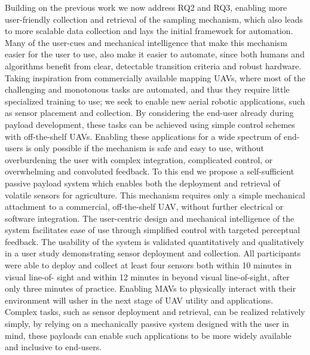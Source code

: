Building on the previous work we now address RQ2 and RQ3, enabling more user-friendly collection and retrieval of the sampling mechanism, which also leads to more scalable data collection and lays the initial framework for automation. Many of the user-cues and mechanical intelligence that make this mechanism easier for the user to use, also make it easier to automate, since both humans and algorithms benefit from clear, detectable transition criteria and robust hardware.  Taking inspiration from commercially available mapping UAVs, where most of the challenging and monotonous tasks are automated, and thus they require little specialized training to use; we seek to enable new aerial robotic applications, such as sensor placement and collection. By considering the end-user already during payload development, these tasks can be achieved using simple control schemes with off-the-shelf UAVs. Enabling these applications for a wide spectrum of end-users is only possible if the mechanism is safe and easy to use, without overburdening the user with complex integration, complicated control, or overwhelming and convoluted feedback. To this end we propose a self-sufficient passive payload system which enables both the deployment and retrieval of volatile sensors for agriculture. This mechanism requires only a simple mechanical attachment to a commercial, off-the-shelf UAV, without further electrical or software integration. The user-centric design and mechanical intelligence of the system facilitates ease of use through simplified control with targeted perceptual feedback. The usability of the system is validated quantitatively and qualitatively in a user study demonstrating sensor deployment and collection. All participants were able to deploy and collect at least four sensors both within 10 minutes in visual line-of- sight and within 12 minutes in beyond visual line-of-sight, after only three minutes of practice. Enabling MAVs to physically interact with their environment will usher in the next stage of UAV utility and applications. Complex tasks, such as sensor deployment and retrieval, can be realized relatively simply, by relying on a mechanically passive system designed with the user in mind, these payloads can enable such applications to be more widely available and inclusive to end-users.



